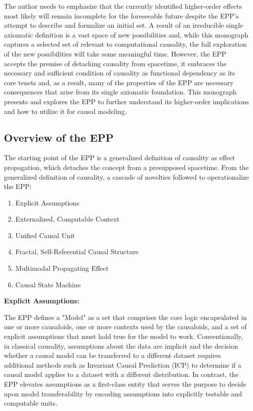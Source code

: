 The author needs to emphasize that the currently identified higher-order effects most likely will remain incomplete for the foreseeable future despite the EPP's attempt to describe and formalize an initial set. A result of an irreducible single axiomatic definition  is a vast space of new possibilities and, while this monograph captures a selected set of relevant to computational causality, the full exploration of the new possibilities will take some meaningful time. However, the EPP accepts the premise of detaching causality from spacetime, it embraces the necessary and sufficient condition of causality as functional dependency as its core tenets and, as a result, many of the properties of the EPP are necessary consequences that arise from its single axiomatic foundation. This monograph presents and explores the EPP to further understand its higher-order implications and how to utilize it for causal modeling. 
% 
%
\subsection{Overview of the EPP}
\label{sec:epp_overview}

The starting point of the EPP is a generalized definition of causality as effect propagation, which detaches the concept from a presupposed spacetime. From the generalized definition of causality, a cascade of novelties followed to operationalize the EPP:

\begin{enumerate}
	\item Explicit Assumptions 
	\item Externalized, Computable Context
	\item Unified Causal Unit
	\item Fractal, Self-Referential Causal Structure
	\item Multimodal Propagating Effect
	\item Causal State Machine 
\end{enumerate}


\textbf{Explicit Assumptions:}

The EPP defines a "Model" as a set that comprises the core logic encapsulated in one or more causaloids, one or more contexts used by the causaloids, and a set of explicit assumptions that must hold true for the model to work. Conventionally, in classical causality, assumptions about the data are  implicit and the decision whether a causal model can be transferred to a different dataset requires additional methods such as Invariant Causal Prediction (ICP) to determine if a causal model applies to a dataset with a different distribution. In contrast, the EPP elevates assumptions as a first-class entity that serves the purpose to decide upon model transferability by encoding assumptions into explicitly testable and computable units. 

